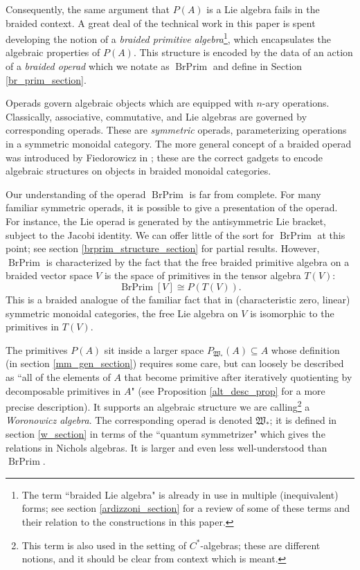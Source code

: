 \documentclass[12pt]{article}
\DeclareMathOperator{\BrPrim}{BrPrim}
\newcommand{\mW}{\mathfrak{W}}
\theoremstyle{plain}
\theoremstyle{definition}
\theoremstyle{remark}
\begin{document}
Consequently, the same argument that $P(A)$ is a Lie algebra fails in the braided context.  A great deal of the technical work in this paper is spent developing the notion of a \emph{braided primitive algebra}\footnote{The term ``braided Lie algebra" is already in use in multiple (inequivalent) forms; see section \ref{ardizzoni_section} for a review of some of these terms and their relation to the constructions in this paper.}, which encapsulates the algebraic properties of $P(A)$.  This structure is encoded by the data of an action of a \emph{braided operad} which we notate as $\BrPrim$ and define in Section \ref{br_prim_section}.

Operads govern algebraic objects which are equipped with $n$-ary operations.  Classically, associative, commutative, and Lie algebras are governed by corresponding operads.  These are \emph{symmetric} operads, parameterizing operations in a symmetric monoidal category.  The more general concept of a braided operad was introduced by Fiedorowicz in \cite{fiedorowicz}; these are the correct gadgets to encode algebraic structures on objects in braided monoidal categories.

Our understanding of the operad $\BrPrim$ is far from complete.  For many familiar symmetric operads, it is possible to give a presentation of the operad.  For instance, the Lie operad is generated by the antisymmetric Lie bracket, subject to the Jacobi identity.  We can offer little of the sort for $\BrPrim$ at this point; see section \ref{brprim_structure_section} for partial results.  However, $\BrPrim$ is characterized by the fact that the free braided primitive algebra on a braided vector space $V$ is the space of primitives in the tensor algebra $T(V)$:
%
$$\BrPrim[V] \cong P(T(V)).$$
%
This is a braided analogue of the familiar fact that in (characteristic zero, linear) symmetric monoidal categories, the free Lie algebra on $V$ is isomorphic to the primitives in $T(V)$.

The primitives $P(A)$ sit inside a larger space $P_{\mW_*}(A) \subseteq A$ whose definition (in section \ref{mm_gen_section}) requires some care, but can loosely be described as ``all of the elements of $A$ that become primitive after iteratively quotienting by decomposable primitives in $A$" (see Proposition \ref{alt_desc_prop} for a more precise description).  It supports an algebraic structure we are calling\footnote{This term is also used in the setting of $C^*$-algebras; these are different notions, and it should be clear from context which is meant.} a \emph{Woronowicz algebra}.  The corresponding operad is denoted $\mW_*$; it is defined in section \ref{w_section} in terms of the ``quantum symmetrizer" which gives the relations in Nichols algebras.  It is larger and even less well-understood than $\BrPrim$. 
\end{document}
